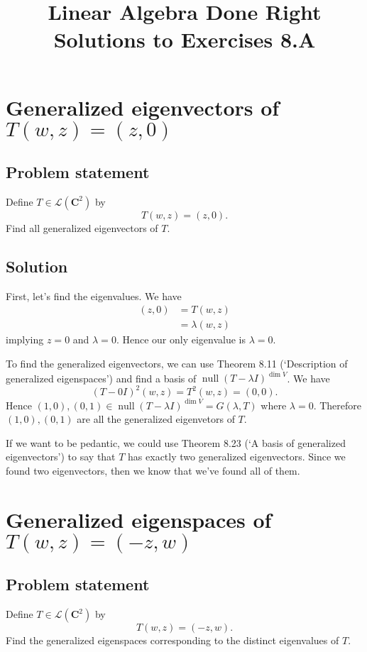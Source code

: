 \documentclass{article}
\title{Linear Algebra Done Right\\Solutions to Exercises 8.A}
\author{}
\date{}
\begin{document}
\maketitle

\section{Generalized eigenvectors of $T(w,z)=(z,0)$}
\subsection*{Problem statement}
Define $T\in\mathcal{L}(\mathbf{C}^2)$ by
\[T(w,z)=(z,0).\]
Find all generalized eigenvectors of $T$.

\subsection*{Solution}
First, let's find the eigenvalues. We have
\begin{align*}
    (z,0)&=T(w,z)\\
    &=\lambda (w,z)
\end{align*}
implying $z=0$ and $\lambda=0$. Hence our only eigenvalue is $\lambda=0$.

To find the generalized eigenvectors, we can use Theorem 8.11 (`Description of generalized eigenspaces') and find a basis of $\operatorname{null}(T-\lambda I)^{\operatorname{dim}V}$. We have
\[(T-0I)^2(w,z)=T^2(w,z)=(0,0).\]
Hence $(1,0),(0,1)\in\operatorname{null}(T-\lambda I)^{\operatorname{dim}V}=G(\lambda,T)$ where $\lambda=0$. Therefore $(1,0),(0,1)$ are all the generalized eigenvetors of $T$.

If we want to be pedantic, we could use Theorem 8.23 (`A basis of generalized eigenvectors') to say that $T$ has exactly two generalized eigenvectors. Since we found two eigenvectors, then we know that we've found all of them.

\clearpage

\section{Generalized eigenspaces of $T(w,z)=(-z,w)$}
\subsection*{Problem statement}
Define $T\in\mathcal{L}(\mathbf{C}^2)$ by
\[T(w,z)=(-z,w).\]
Find the generalized eigenspaces corresponding to the distinct eigenvalues of $T$.
\end{document}
